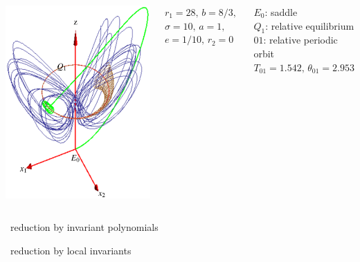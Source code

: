 \documentclass{beamer}
\begin{document}
\begin{frame}
  \begin{columns}[t]
	\begin{block}{}
	\begin{center}
		\includegraphics[width=.7\textwidth]{../../figs/CLE.eps}
	\end{center}
	\end{block}
	\begin{block}{ }
	 ${r_1=28,}\, {b=8/3,}\,$ ${\sigma=10,}\, {a=1,}\,$ ${e=1/10,}\, {r_2=0}$
	\end{block}
	\begin{block}{ }
	  $E_0$: saddle\\
	  $Q_1$: relative equilibrium\\ 
	  $01$:  relative periodic orbit $T_{01}=1.542,\, \theta_{01}=2.953$
	\end{block}
   \end{columns}
\end{frame}


\begin{frame}{\CLe\ reduction by invariant polynomials}
\end{frame}

\begin{frame}{\CLe\ reduction by local invariants}
\end{frame}
\end{document}

